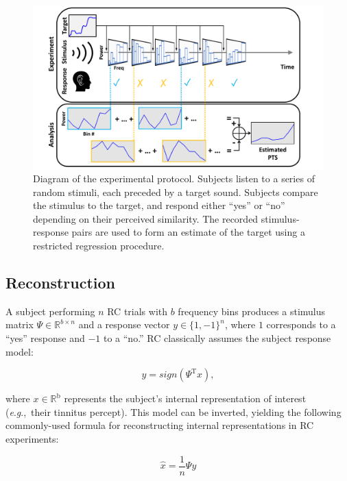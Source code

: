 \documentclass[journal]{IEEEtran}
\newcommand{\eg}{\textit{e}.\textit{g}.,\ }
\begin{document}
\begin{figure}[t]
  \centering
  \includegraphics[width=\linewidth]{experiment_overview.pdf}
  \caption{Diagram of the experimental protocol.
  Subjects listen to a series of random stimuli,
  each preceded by a target sound.
  Subjects compare the stimulus to the target, and respond either ``yes'' or ``no''
  depending on their perceived similarity.
  The recorded stimulus-response pairs are used to form an estimate of the target
  using a restricted regression procedure.}
  \label{fig:experimentdiagram}
\end{figure}

\subsection{Reconstruction}

A subject performing $n$ RC trials with $b$ frequency bins produces a stimulus matrix $\Psi \in \mathbb{R}^{b \times n}$
and a response vector $y \in \{1,-1\}^n$,
where $1$ corresponds to a ``yes'' response and $-1$ to a ``no.'' RC classically assumes the subject response model:

\begin{equation}
  y = sign(\Psi^\mathrm{T} x), 
\end{equation}

where $x \in \mathbb{R}^\mathrm{b}$ represents the subject's internal representation of interest (\eg their tinnitus percept).
This model can be inverted, yielding the following commonly-used formula for reconstructing internal representations in RC experiments:

\begin{equation}
  \hat{x} = \frac{1}{n} \Psi y
  \label{eq:linreg}
\end{equation}
\end{document}
